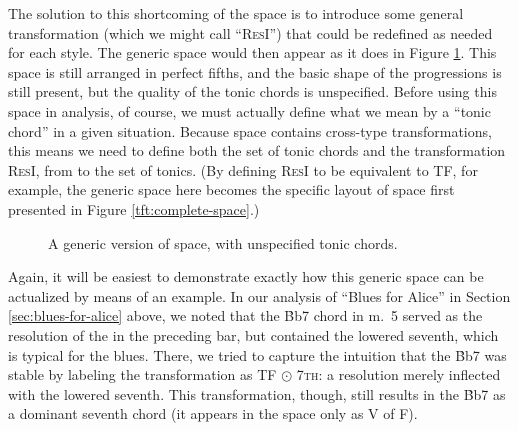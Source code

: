 {The solution to this shortcoming of the space is to introduce some general
transformation (which we might call ``\textsc{ResI}'') that could be redefined
as needed for each style. The generic space would then appear as it
does in Figure \ref{tfe:generic-space}. This space is still arranged in
perfect fifths, and the basic shape of the \tfo progressions is still present,
but the quality of the tonic chords is unspecified. Before using this space in
analysis, of course, we must actually define what we mean by a ``tonic chord''
in a given situation. Because \tf space contains cross-type transformations,
this means we need to define both the set of tonic chords and the
transformation \textsc{ResI}, from \Sdom to the set of tonics. (By defining
\textsc{ResI} to be equivalent to TF, for example, the generic space here
becomes the specific layout of \tf space first presented in Figure
\ref{tft:complete-space}.)

\begin{figure}[tbp]
  \caption{A generic version of \tf space, with unspecified tonic chords.}
  \label{tfe:generic-space}
\end{figure}

Again, it will be easiest to demonstrate exactly how this generic space can be
actualized by means of an example. In our analysis of ``Blues for Alice'' in
Section \ref{sec:blues-for-alice} above, we noted that the \h{Bb7} chord in
m.~5 served as the resolution of the \tf in the preceding bar, but contained
the lowered seventh, which is typical for the blues. There, we tried to
capture the intuition that the \h{Bb7} was stable by labeling the
transformation as TF $\odot$ \textsc{7th}: a resolution merely inflected with
the lowered seventh. This transformation, though, still results in the \h{Bb7}
as a dominant seventh chord (it appears in the space only as V of F).

}

